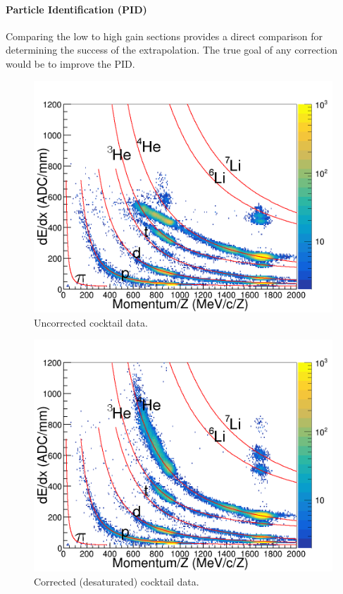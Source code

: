 \documentclass[review]{elsarticle}
\begin{document}
\paragraph{Particle Identification (PID)}

Comparing the low to high gain sections provides a direct comparison for determining the success of the extrapolation. The true goal of any correction would be to improve the PID. 
\begin{figure}[h]
\label{fig:cocktail_raw}
\includegraphics[width=\linewidth]{cocktail_raw}
\caption{Uncorrected cocktail data.}
\end{figure}

\begin{figure}[ht]
\label{fig:data_desat}
\includegraphics[width=\linewidth]{cocktail_desat}
\caption{Corrected (desaturated) cocktail data.}
\end{figure}
\end{document}
